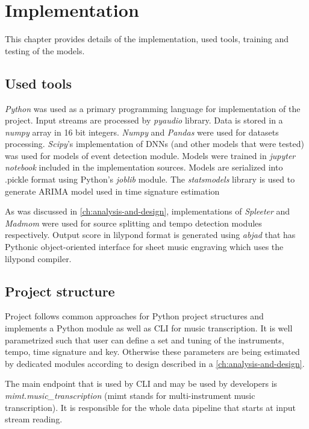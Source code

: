 \chapter{Implementation}\label{ch:implementation}

This chapter provides details of the implementation, used tools, training and testing of the models.


\section{Used tools}\label{sec:used-tools}

\textit{Python} was used as a primary programming language for implementation of the project. Input streams are
processed by \textit{pyaudio} library. Data is stored in a \textit{numpy} array in 16 bit integers. \textit{Numpy} and
\textit{Pandas} were used for datasets processing. \textit{Scipy}'s implementation of \acp{DNN} (and other models that
were tested) was used for models of event detection module. Models were trained in \textit{jupyter notebook} included
in the implementation sources. Models are serialized into .pickle format using Python's \textit{joblib} module.
The \textit{statsmodels} library is used to generate \ac{ARIMA} model used in time signature estimation

As was discussed in \cref{ch:analysis-and-design}, implementations of \textit{Spleeter} and \textit{Madmom} were used
for source splitting and tempo detection modules respectively. Output score in lilypond format is generated using
\textit{abjad} that has Pythonic object-oriented interface for sheet music engraving which uses the lilypond compiler.



\section{Project structure}\label{sec:project-structure}
Project follows common approaches for Python project structures and implements a Python module as well as \ac{CLI} for
music transcription. It is well parametrized such that user can define a set and tuning of the instruments, tempo, time
signature and key. Otherwise these parameters are being estimated by dedicated modules according to design described in
a \cref{ch:analysis-and-design}.

The main endpoint that is used by \ac{CLI} and may be used by developers is \textit{mimt.music\_transcription} (mimt
stands for multi-instrument music transcription). It is responsible for the whole data pipeline that starts at input
stream reading.

